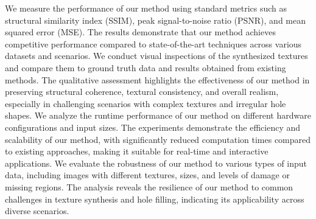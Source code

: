\begin{experiments}
We measure the performance of our method using standard metrics such as structural similarity index (SSIM), peak signal-to-noise ratio (PSNR), and mean squared error (MSE). The results demonstrate that our method achieves competitive performance compared to state-of-the-art techniques across various datasets and scenarios. We conduct visual inspections of the synthesized textures and compare them to ground truth data and results obtained from existing methods. The qualitative assessment highlights the effectiveness of our method in preserving structural coherence, textural consistency, and overall realism, especially in challenging scenarios with complex textures and irregular hole shapes. We analyze the runtime performance of our method on different hardware configurations and input sizes. The experiments demonstrate the efficiency and scalability of our method, with significantly reduced computation times compared to existing approaches, making it suitable for real-time and interactive applications. We evaluate the robustness of our method to various types of input data, including images with different textures, sizes, and levels of damage or missing regions. The analysis reveals the resilience of our method to common challenges in texture synthesis and hole filling, indicating its applicability across diverse scenarios.

\end{experiments}